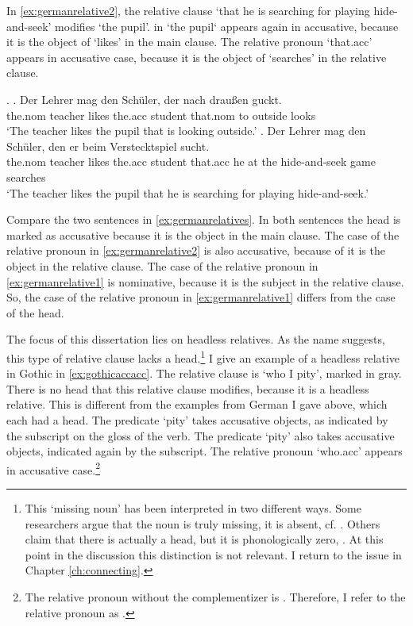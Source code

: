 In \ref{ex:germanrelative2}, the relative clause  `that he is searching for playing hide-and-seek' modifies  `the pupil'.  in  `the pupil` appears again in accusative, because it is the object of  `likes' in the main clause. The relative pronoun  `that.\ac{acc}' appears in accusative case, because it is the object of  `searches' in the relative clause.

\ex.\label{ex:germanrelatives}
\ag. Der Lehrer mag den Schüler, der nach draußen guckt.\\
 the.\ac{nom} teacher likes the.\ac{acc} student that.\ac{nom} to outside looks\\
 `The teacher likes the pupil that is looking outside.'\label{ex:germanrelative1}
 \bg. Der Lehrer mag den Schüler, den er beim Verstecktspiel sucht.\\
 the.\ac{nom} teacher likes the.\ac{acc} student that.\ac{acc} he at the {hide-and-seek game} searches\\
 `The teacher likes the pupil that he is searching for playing hide-and-seek.'\label{ex:germanrelative2}

Compare the two sentences in \ref{ex:germanrelatives}. In both sentences the head is marked as accusative because it is the object in the main clause. The case of the relative pronoun in \ref{ex:germanrelative2} is also accusative, because of it is the object in the relative clause. The case of the relative pronoun in \ref{ex:germanrelative1} is nominative, because it is the subject in the relative clause. So, the case of the relative pronoun in \ref{ex:germanrelative1} differs from the case of the head.

The focus of this dissertation lies on headless relatives. As the name suggests, this type of relative clause lacks a head.\footnote{
This `missing noun' has been interpreted in two different ways. Some researchers argue that the noun is truly missing, it is absent, cf. \citealt{citko2005,vanriemsdijk2006}. Others claim that there is actually a head, but it is phonologically zero, \citealt{bresnan1978,groos1981,grosu2003}. At this point in the discussion this distinction is not relevant. I return to the issue in Chapter \ref{ch:connecting}.
}
I give an example of a headless relative in Gothic in \ref{ex:gothicaccacc}. The relative clause is  `who I pity', marked in gray. There is no head that this relative clause modifies, because it is a headless relative. This is different from the examples from German I gave above, which each had a head.
The predicate  `pity' takes accusative objects, as indicated by the subscript on the gloss of the verb. The predicate  `pity' also takes accusative objects, indicated again by the subscript.
The relative pronoun  `who.\ac{acc}' appears in accusative case.\footnote{
The relative pronoun without the complementizer  is . Therefore, I refer to the relative pronoun as .
}

